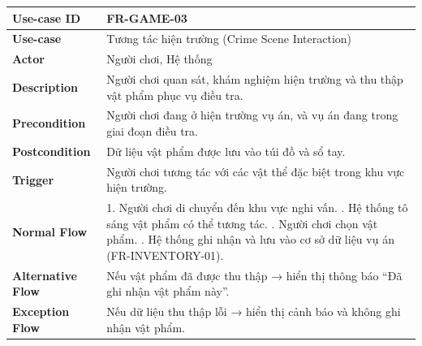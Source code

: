 \begin{table}[H]
\centering
\begin{tabular}{|p{4cm}|p{10cm}|}
\hline
\textbf{Use-case ID} & FR-GAME-03 \\ \hline
\textbf{Use-case} & Tương tác hiện trường (Crime Scene Interaction) \\ \hline
\textbf{Actor} & Người chơi, Hệ thống \\ \hline
\textbf{Description} & Người chơi quan sát, khám nghiệm hiện trường và thu thập vật phẩm phục vụ điều tra. \\ \hline
\textbf{Precondition} & Người chơi đang ở hiện trường vụ án, và vụ án đang trong giai đoạn điều tra. \\ \hline
\textbf{Postcondition} & Dữ liệu vật phẩm được lưu vào túi đồ và sổ tay. \\ \hline
\textbf{Trigger} & Người chơi tương tác với các vật thể đặc biệt trong khu vực hiện trường. \\ \hline
\textbf{Normal Flow} &
1. Người chơi di chuyển đến khu vực nghi vấn. \newline
2. Hệ thống tô sáng vật phẩm có thể tương tác. \newline
3. Người chơi chọn vật phẩm. \newline
4. Hệ thống ghi nhận và lưu vào cơ sở dữ liệu vụ án (FR-INVENTORY-01). \\ \hline
\textbf{Alternative Flow} &
Nếu vật phẩm đã được thu thập → hiển thị thông báo “Đã ghi nhận vật phẩm này”. \\ \hline
\textbf{Exception Flow} &
Nếu dữ liệu thu thập lỗi → hiển thị cảnh báo và không ghi nhận vật phẩm. \\ \hline
\end{tabular}
\end{table}


